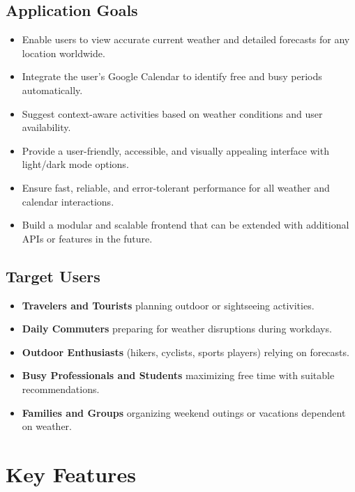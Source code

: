 \documentclass[12pt,a4paper]{article}
\begin{document}
\subsection{Application Goals}
\begin{itemize}[nosep]
  \item Enable users to view accurate current weather and detailed forecasts for any location worldwide.
  \item Integrate the user’s Google Calendar to identify free and busy periods automatically.
  \item Suggest context-aware activities based on weather conditions and user availability.
  \item Provide a user-friendly, accessible, and visually appealing interface with light/dark mode options.
  \item Ensure fast, reliable, and error-tolerant performance for all weather and calendar interactions.
  \item Build a modular and scalable frontend that can be extended with additional APIs or features in the future.
\end{itemize}

\subsection{Target Users}
\begin{itemize}[nosep]
  \item \textbf{Travelers and Tourists} planning outdoor or sightseeing activities.
  \item \textbf{Daily Commuters} preparing for weather disruptions during workdays.
  \item \textbf{Outdoor Enthusiasts} (hikers, cyclists, sports players) relying on forecasts.
  \item \textbf{Busy Professionals and Students} maximizing free time with suitable recommendations.
  \item \textbf{Families and Groups} organizing weekend outings or vacations dependent on weather.
\end{itemize}

\newpage

\section{Key Features}
\end{document}
